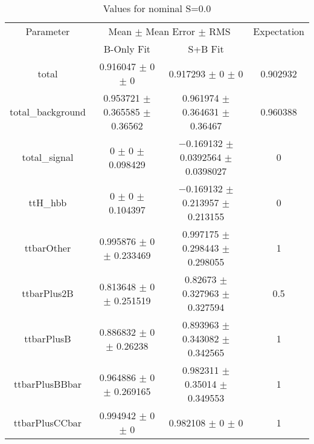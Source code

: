 \begin{table}
\centering
\caption{Values for nominal S=0.0}
\begin{tabular}{cccc}
\toprule
Parameter & \multicolumn{2}{c}{Mean $\pm$ Mean Error $\pm$ RMS} & Expectation\\
 & B-Only Fit & S+B Fit & \\
\midrule
total & \num{0.916047} $\pm$ \num{0} $\pm$ \num{0} & \num{0.917293} $\pm$ \num{0} $\pm$ \num{0} & \num{0.902932}\\
total\_background & \num{0.953721} $\pm$ \num{0.365585} $\pm$ \num{0.36562} & \num{0.961974} $\pm$ \num{0.364631} $\pm$ \num{0.36467} & \num{0.960388}\\
total\_signal & \num{0} $\pm$ \num{0} $\pm$ \num{0.098429} & \num{-0.169132} $\pm$ \num{0.0392564} $\pm$ \num{0.0398027} & \num{0}\\
ttH\_hbb & \num{0} $\pm$ \num{0} $\pm$ \num{0.104397} & \num{-0.169132} $\pm$ \num{0.213957} $\pm$ \num{0.213155} & \num{0}\\
ttbarOther & \num{0.995876} $\pm$ \num{0} $\pm$ \num{0.233469} & \num{0.997175} $\pm$ \num{0.298443} $\pm$ \num{0.298055} & \num{1}\\
ttbarPlus2B & \num{0.813648} $\pm$ \num{0} $\pm$ \num{0.251519} & \num{0.82673} $\pm$ \num{0.327963} $\pm$ \num{0.327594} & \num{0.5}\\
ttbarPlusB & \num{0.886832} $\pm$ \num{0} $\pm$ \num{0.26238} & \num{0.893963} $\pm$ \num{0.343082} $\pm$ \num{0.342565} & \num{1}\\
ttbarPlusBBbar & \num{0.964886} $\pm$ \num{0} $\pm$ \num{0.269165} & \num{0.982311} $\pm$ \num{0.35014} $\pm$ \num{0.349553} & \num{1}\\
ttbarPlusCCbar & \num{0.994942} $\pm$ \num{0} $\pm$ \num{0} & \num{0.982108} $\pm$ \num{0} $\pm$ \num{0} & \num{1}\\
\bottomrule
\end{tabular}
\end{table}